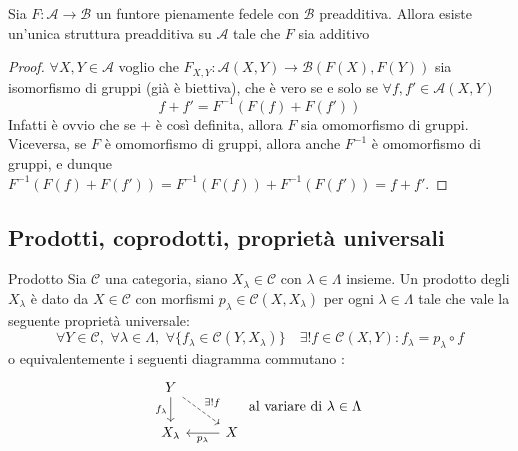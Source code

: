 \begin{remark}{}
    Sia \(F : \mathcal{A} \to \mathcal{B}\) un funtore pienamente fedele con \(\mathcal{B}\) preadditiva.
    Allora esiste un'unica struttura preadditiva su \(\mathcal{A}\) tale che \(F\) 
    sia additivo
\end{remark}
\begin{proof}{}
    \(\forall X, Y \in \mathcal{A}\) voglio che \(F_{X,Y}  : \mathcal{A}{(X, Y)} \to \mathcal{B}{(F{(X)}, F{(Y)})}\) sia isomorfismo di gruppi (già è biettiva), che è vero se e solo se \(\forall f, f' \in \mathcal{A}{(X,Y)}\) 
    \[
      f + f' = F^{-1}{(F{(f)} + F{(f')})} 
    \]
    Infatti è ovvio che se \(+\) è così definita, allora \(F\) sia omomorfismo
    di gruppi. Viceversa, se \(F\) è omomorfismo di gruppi, allora anche \(F^{-1}\) è omomorfismo di gruppi, 
    e dunque \(F^{-1}{(F{(f)} + F{(f')})} = F^{-1}{(F{(f)})} + F^{-1}{(F{(f')})} = f + f'\).

\end{proof}

\subsection{Prodotti, coprodotti, proprietà universali}

\begin{definition}{Prodotto}
Sia \(\mathcal{\mathcal{C}}\) una categoria, siano \(
X_\lambda \in \mathcal{\mathcal{C}}\) con \(\lambda \in \Lambda\) insieme. Un prodotto
degli \(
X_\lambda\) è dato da \(X \in \mathcal{\mathcal{C}}\) con morfismi \(p_\lambda
\in \mathcal{C}{(X, X_\lambda)}\) per ogni \(\lambda \in \Lambda\) tale che
vale la seguente proprietà universale:
\[
  \forall Y \in \mathcal{\mathcal{C}}, \,\, \forall \lambda \in \Lambda, \,\,
  \forall \{f_{\lambda} \in \mathcal{\mathcal{C}}{(Y, X_\lambda)} \}\quad \exists ! f \in \mathcal{\mathcal{C}}{(X, Y)} : f_\lambda = p_\lambda \circ f
\]
o equivalentemente i seguenti diagramma commutano :
\[\begin{tikzcd}
	Y \\
	{X_\lambda} & X
	\arrow["{f_\lambda}"', from=1-1, to=2-1]
	\arrow["{\exists ! f}", dashed, from=1-1, to=2-2]
	\arrow["{p_\lambda}", from=2-2, to=2-1]
\end{tikzcd} \text{ al variare di \(\lambda \in \Lambda\) }\]
\end{definition}


